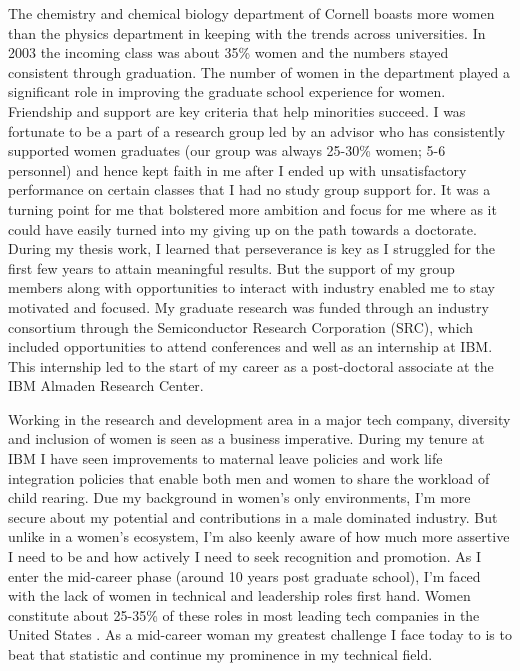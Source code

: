 \documentclass[utf8]{frontiersSCNS} %
\begin{document}
The chemistry and chemical biology department of Cornell boasts more women than the physics department in keeping with the trends across universities. In 2003 the incoming class was about 35\% women and the numbers stayed consistent through graduation. The number of women in the department played a significant role in improving the graduate school experience for women. Friendship and support are key criteria that help  minorities succeed. I was fortunate to be a part of a research group led by an advisor who has consistently supported women graduates (our group was always 25-30\% women; 5-6 personnel) and hence kept faith in me after I ended up with unsatisfactory performance on certain classes that I had no study group support for. It was a turning point for me that bolstered more ambition and focus for me where as it could have easily turned into my giving up on the path towards a doctorate. During my thesis work, I learned that perseverance is key as I struggled for the first few years to attain meaningful results. But the support of my group members along with opportunities to interact with industry enabled me to stay motivated and focused. My graduate research was funded through an industry consortium through the Semiconductor Research Corporation (SRC), which included opportunities to attend conferences and well as an internship at IBM. This internship led to the start of my career as a post-doctoral associate at the IBM Almaden Research Center.

Working in the research and development area in a major tech company, diversity and inclusion of women is seen as a business imperative. During my tenure at IBM I have seen improvements to maternal leave policies and work life integration policies that enable both men and women to share the workload of child rearing. Due my background in women’s only environments, I’m more secure about my potential and contributions in a male dominated industry. But unlike in a women’s ecosystem, I’m also keenly aware of how much more assertive I need to be and how actively I need to seek recognition and promotion. As I enter the mid-career phase (around 10 years post graduate school), I’m faced with the lack of women in technical and leadership roles first hand.  Women constitute about 25-35\% of these roles in most leading tech companies in the United States \citep{techcompanies}. As a mid-career woman my greatest challenge I face today to is to beat that statistic and continue my prominence in my technical field.
\end{document}
